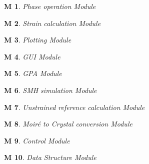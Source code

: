 \documentclass[12pt, titlepage]{article}
\newtheorem{M}{M}
\begin{document}
\begin{M}\normalfont Phase operation Module
\label{M_Phase}
\end{M}

\begin{M}\normalfont Strain calculation Module
\label{M_StrainCalc}
\end{M}

\begin{M}\normalfont Plotting Module
\label{M_Plot}
\end{M}

\begin{M}\normalfont GUI Module
\label{M_GUI}
\end{M}

\begin{M}\normalfont GPA Module
\label{M_GPA}
\end{M}

\begin{M}\normalfont SMH simulation Module
\label{M_SMHSim}
\end{M}

\begin{M}\normalfont Unstrained reference calculation Module
\label{M_URef}
\end{M}

\begin{M}\normalfont Moir{\'e} to Crystal conversion Module
\label{M_MtoCConv}
\end{M}

\begin{M}\normalfont Control Module
\label{M_Control}
\end{M}

\begin{M}\normalfont Data Structure Module
\label{M_DataStruct}
\end{M}
\end{document}
